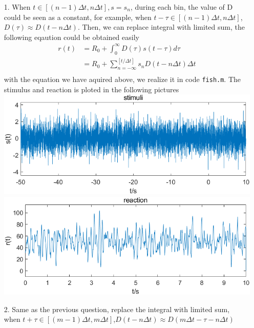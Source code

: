 \documentclass{article}
\begin{document}
\begin{enumerate}
    \item[1.]When $t \in [(n-1)\Delta t,n \Delta t], s= s_n$,
          during each bin, the value of D could be seen as a constant,
          for example, when $t-\tau \in[(n-1)\Delta t,n\Delta t]$,$D(\tau)\approx D(t-n\Delta t)$.
          Then, we can replace integral with limited sum, the following eqaution could be obtained easily
          \begin{equation}
              \begin{split}
                  r(t) &= R_0+\int^\infty_0 D(\tau)s(t-\tau)d\tau\\
                  &= R_0+\sum_{n=-\infty}^{[t/\Delta t]} s_n D(t-n\Delta t)\Delta t \\
              \end{split}
          \end{equation}
          with the equation we have aquired above, we realize it in code \texttt{fish.m}. The stimulus and reaction is ploted in the following pictures\\
          \includegraphics[scale = 0.8]{pics/2_1_stimuli.png}\\
          \includegraphics[scale = 0.8]{pics/2_1_reaction.png}

    \item[2.]
          Same as the previous question, replace the integral with limited sum, \\
          when $t+\tau \in[(m-1)\Delta t,m\Delta t]$,$D(t-n\Delta t)\approx D(m\Delta t-\tau-n\Delta t)$


\end{enumerate}
\end{document}
